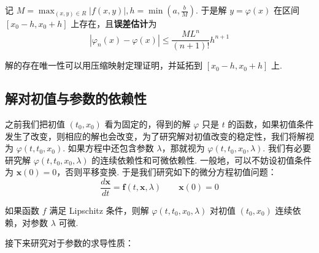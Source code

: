 记 $\displaystyle M=\max_{(x,y)\in R}\lvert f(x,y) \rvert,h=\min\left( a,\frac{b}{M} \right)$. 于是解 $\displaystyle y=\varphi(x)$ 在区间 $\displaystyle [x_{0}-h,x_{0}+h]$ 上存在，且\textbf{误差估计}为
$$
    \left|\varphi_n(x)-\varphi(x)\right| \leqslant \frac{M L^n}{(n+1)!} h^{n+1}
$$
\begin{note}
    解的存在唯一性可以用压缩映射定理证明\cite{Arnold}，并延拓到 $\displaystyle [x_{0}-h,x_{0}+h]$ 上.
\end{note}

\subsection{解对初值与参数的依赖性}

之前我们把初值 $\displaystyle (t_{0},x_{0})$ 看为固定的，得到的解 $\displaystyle \varphi$ 只是 $\displaystyle t$ 的函数，如果初值条件发生了改变，则相应的解也会改变，为了研究解对初值改变的稳定性，我们将解视为 $\displaystyle \varphi(t,t_{0},x_{0})$. 如果方程中还包含参数 $\displaystyle \lambda$，那就视为 $\displaystyle \varphi(t,t_{0},x_{0},\lambda)$. 我们有必要研究解 $\displaystyle \varphi(t,t_{0},x_{0},\lambda)$ 的连续依赖性和可微依赖性. 一般地，可以不妨设初值条件为 $\displaystyle \mathbf{x}(0)=0$，否则平移变换. 于是我们研究如下的微分方程初值问题：
$$
    \frac{d\mathbf{x}}{dt}=\mathbf{f}(t,\mathbf{x},\lambda)\qquad \mathbf{x}(0)=0
$$
\begin{note}
    如果函数 $f$ 满足 Lipschitz 条件，则解 $\displaystyle \varphi(t,t_{0},x_{0},\lambda)$ 对初值 $\displaystyle (t_{0},x_{0})$ 连续依赖，对参数 $\displaystyle \lambda$ 可微.
\end{note}
接下来研究对于参数的求导性质：

